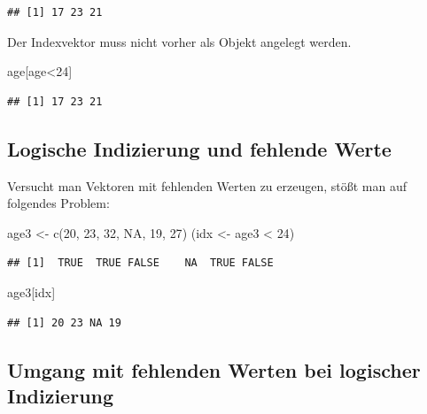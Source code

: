 \documentclass[
]{book}
\newenvironment{Shaded}{\begin{snugshade}}{\end{snugshade}}
\newcommand{\ConstantTok}[1]{\textcolor[rgb]{0.00,0.00,0.00}{#1}}
\newcommand{\DecValTok}[1]{\textcolor[rgb]{0.00,0.00,0.81}{#1}}
\newcommand{\FunctionTok}[1]{\textcolor[rgb]{0.00,0.00,0.00}{#1}}
\newcommand{\NormalTok}[1]{#1}
\newcommand{\OtherTok}[1]{\textcolor[rgb]{0.56,0.35,0.01}{#1}}
\newcommand{\SpecialCharTok}[1]{\textcolor[rgb]{0.00,0.00,0.00}{#1}}
\begin{document}
\begin{verbatim}
## [1] 17 23 21
\end{verbatim}

Der Indexvektor muss nicht vorher als Objekt angelegt werden.

\begin{Shaded}
\begin{Highlighting}[]
\NormalTok{age[age}\SpecialCharTok{\textless{}}\DecValTok{24}\NormalTok{]}
\end{Highlighting}
\end{Shaded}

\begin{verbatim}
## [1] 17 23 21
\end{verbatim}

\hypertarget{logische-indizierung-und-fehlende-werte}{%
\subsection{Logische Indizierung und fehlende Werte}\label{logische-indizierung-und-fehlende-werte}}

Versucht man Vektoren mit fehlenden Werten zu erzeugen, stößt man auf folgendes Problem:

\begin{Shaded}
\begin{Highlighting}[]
\NormalTok{age3 }\OtherTok{\textless{}{-}}  \FunctionTok{c}\NormalTok{(}\DecValTok{20}\NormalTok{, }\DecValTok{23}\NormalTok{, }\DecValTok{32}\NormalTok{, }\ConstantTok{NA}\NormalTok{, }\DecValTok{19}\NormalTok{, }\DecValTok{27}\NormalTok{)}
\NormalTok{(idx }\OtherTok{\textless{}{-}}\NormalTok{ age3 }\SpecialCharTok{\textless{}} \DecValTok{24}\NormalTok{)}
\end{Highlighting}
\end{Shaded}

\begin{verbatim}
## [1]  TRUE  TRUE FALSE    NA  TRUE FALSE
\end{verbatim}

\begin{Shaded}
\begin{Highlighting}[]
\NormalTok{age3[idx]}
\end{Highlighting}
\end{Shaded}

\begin{verbatim}
## [1] 20 23 NA 19
\end{verbatim}

\hypertarget{umgang-mit-fehlenden-werten-bei-logischer-indizierung}{%
\subsection{Umgang mit fehlenden Werten bei logischer Indizierung}\label{umgang-mit-fehlenden-werten-bei-logischer-indizierung}}
\end{document}
